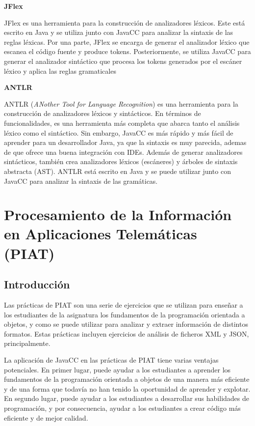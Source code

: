 \noindent \textbf{JFlex}

\phantom{text}

\noindent JFlex es una herramienta para la construcción de analizadores léxicos. Este está escrito en Java y se utiliza junto con JavaCC para analizar la sintaxis de las reglas léxicas. Por una parte, JFlex se encarga de generar el analizador léxico que escanea el código fuente y produce tokens. Posteriormente, se utiliza JavaCC para generar el analizador sintáctico que procesa los tokens generados por el escáner léxico y aplica las reglas gramaticales

\phantom{text}

\noindent \textbf{ANTLR}

\phantom{text}

\noindent ANTLR (\textit{ANother Tool for Language Recognition}) es una herramienta para la construcción de analizadores léxicos y sintácticos. En términos de funcionalidades, es una herramienta más completa que abarca tanto el análisis léxico como el sintáctico. Sin embargo, JavaCC es más rápido y más fácil de aprender para un desarrollador Java, ya que la sintaxis es muy parecida, ademas de que ofrece una buena integración con IDEs\cite{antlr}. Además de generar analizadores sintácticos, también crea analizadores léxicos (escáneres) y árboles de sintaxis abstracta (AST).
ANTLR está escrito en Java y se puede utilizar junto con JavaCC para analizar la sintaxis de las gramáticas.

\section{Procesamiento de la Información en Aplicaciones Telemáticas (PIAT)}
\subsection{Introducción}
\noindent Las prácticas de PIAT son una serie de ejercicios que se utilizan para enseñar a los estudiantes de la asignatura los fundamentos de la programación orientada a objetos, y como se puede utilizar para analizar y extraer información de distintos formatos. Estas prácticas incluyen ejercicios de análisis de ficheros XML y JSON, principalmente.

La aplicación de JavaCC en las prácticas de PIAT tiene varias ventajas potenciales. En primer lugar, puede ayudar a los estudiantes a aprender los fundamentos de la programación orientada a objetos de una manera más eficiente y de una forma que todavía no han tenido la oportunidad de aprender y explotar. En segundo lugar, puede ayudar a los estudiantes a desarrollar sus habilidades de programación, y por consecuencia, ayudar a los estudiantes a crear código más eficiente y de mejor calidad.
